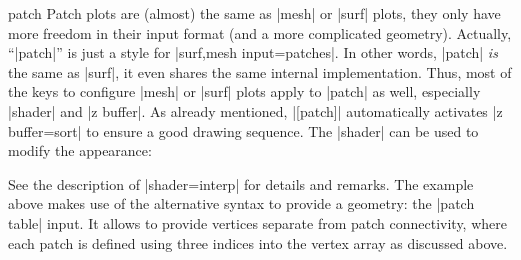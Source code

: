 {\begin{plottype}[/pgfplots]{patch}
	Patch plots are (almost) the same as |mesh| or |surf| plots, they only have more freedom in their input format (and a more complicated geometry). Actually, ``|patch|'' is just a style for |surf,mesh input=patches|. In other words, |patch| \emph{is} the same as |surf|, it even shares the same internal implementation. Thus, most of the keys to configure |mesh| or |surf| plots apply to |patch| as well, especially |shader| and |z buffer|. As already mentioned, |[patch]| automatically activates |z buffer=sort| to ensure a good drawing sequence. The |shader| can be used to modify the appearance:
\pgfplotsexpensiveexample
\begin{codeexample}[]
\end{codeexample}
	See the description of |shader=interp| for details and remarks. The example above makes use of the alternative syntax to provide a geometry: the |patch table| input. It allows to provide vertices separate from patch connectivity, where each patch is defined using three indices into the vertex array as discussed above.

\pgfplotsexpensiveexample
\begin{codeexample}[]
\end{codeexample}


\end{plottype}}
